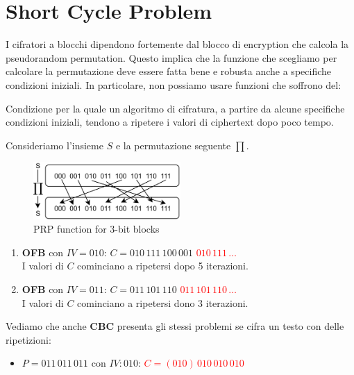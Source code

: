 \section{Short Cycle Problem}
I cifratori a blocchi dipendono fortemente dal blocco di encryption che calcola la pseudorandom permutation. Questo implica che la funzione che scegliamo per calcolare la permutazione deve essere fatta bene e robusta anche a specifiche condizioni iniziali. In particolare, non possiamo usare funzioni che soffrono del:
\begin{definition}\label{def:shortcycle}
Condizione per la quale un algoritmo di cifratura, a partire da alcune specifiche condizioni iniziali, tendono a ripetere i valori di ciphertext dopo poco tempo.
\end{definition}
\begin{example} Consideriamo l'insieme $S$ e la permutazione seguente $\prod$.
\begin{figure}[h]
    \centering
    \includegraphics[width=0.5\textwidth]{image/shortcycle.png}
    \caption{PRP function for 3-bit blocks}
    \label{fig:shortcycle}
\end{figure}
\begin{enumerate}
    \item \textbf{OFB} con $IV=010$: $C=010\,111\,100\,001$ \textcolor{red}{$010\,111\,\dots$}\\
    I valori di $C$ cominciano a ripetersi dopo 5 iterazioni.
    \item \textbf{OFB} con $IV=011$: $C=011\,101\,110$ \textcolor{red}{$011\,101\,110\,\dots$}\\
    I valori di $C$ cominciano a ripetersi dono 3 iterazioni.
\end{enumerate}
\end{example}
\begin{example}Vediamo che anche \textbf{CBC} presenta gli stessi problemi se cifra un testo con delle ripetizioni: 
\begin{itemize}
    \item $P=011\,011\,011$ con $IV:010$: \textcolor{red}{$C=(010)\,010\,010\,010$}
\end{itemize}
\end{example}
